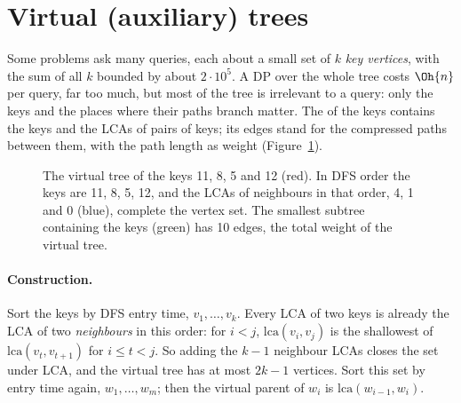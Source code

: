 \section[Virtual trees]{Virtual (auxiliary) trees \hfill \plat}\label{sec:virtualtree}

Some problems ask many queries, each about a small set of $k$ \emph{key vertices}, with the sum of all $k$ bounded by about $2
\cdot 10^5$. A DP over the whole tree costs $\Oh{n}$ per query, far too much, but most of the tree is irrelevant to a query: only
the keys and the places where their paths branch matter. The  of the keys contains the keys and the LCAs of
pairs of keys; its edges stand for the compressed paths between them, with the path length as weight
(Figure~\ref{fig:virtualtree}).

\begin{figure}[htbp]
\centering
{}
\caption{The virtual tree of the keys 11, 8, 5 and 12 (red). In DFS order the keys are 11, 8, 5, 12, and the LCAs of neighbours
in that order, 4, 1 and 0 (blue), complete the vertex set. The smallest subtree containing the keys (green) has 10 edges, the
total weight of the virtual tree.}
\label{fig:virtualtree}
\end{figure}

\paragraph{Construction.} Sort the keys by DFS entry time, $v_1, \dots, v_k$. Every LCA of two keys is already the LCA of two
\emph{neighbours} in this order: for $i < j$, $\mathrm{lca}(v_i, v_j)$ is the shallowest of $\mathrm{lca}(v_t, v_{t+1})$ for $i \le t
< j$. So adding the $k - 1$ neighbour LCAs closes the set under LCA, and the virtual tree has at most $2k - 1$ vertices. Sort this
set by entry time again, $w_1, \dots, w_m$; then the virtual parent of $w_i$ is $\mathrm{lca}(w_{i-1}, w_i)$.

